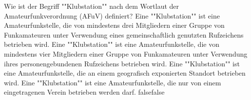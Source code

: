     {Wie ist der Begriff ""Klubstation"" nach dem Wortlaut der Amateurfunkverordnung (AFuV) definiert?}
    {Eine ""Klubstation"" ist eine Amateurfunkstelle, die von mindestens drei Mitgliedern einer Gruppe von Funkamateuren unter Verwendung eines gemeinschaftlich genutzten Rufzeichens betrieben wird.}
    {Eine ""Klubstation"" ist eine Amateurfunkstelle, die von mindestens vier Mitgliedern einer Gruppe von Funkamateuren unter Verwendung ihres personengebundenen Rufzeichens betrieben wird.}
    {Eine ""Klubstation"" ist eine Amateurfunkstelle, die an einem geografisch exponierten Standort betrieben wird.}
    {Eine ""Klubstation"" ist eine Amateurfunkstelle, die nur von einem eingetragenen Verein betrieben werden darf.}
    {false}{false}